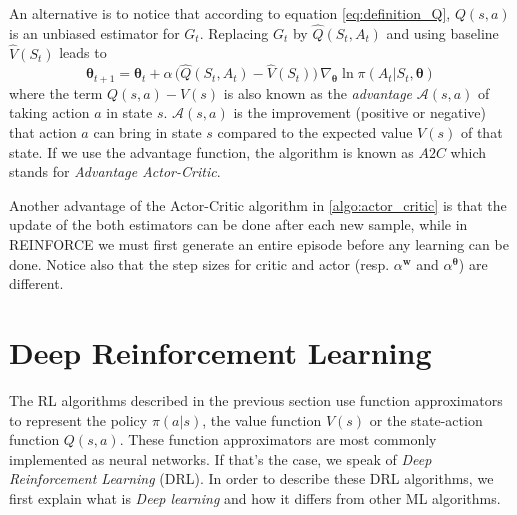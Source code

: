 An alternative is to notice that according to equation \ref{eq:definition_Q}, $Q(s,a)$ is an unbiased estimator for $G_t$. Replacing $G_t$ by $\hat Q(S_t, A_t)$ and using baseline $\hat V(S_t)$ leads to
\begin{equation}
\bm{\theta}_{t+1} = \bm{\theta}_{t} + \alpha \,\big (\hat Q(S_t, A_t) - \hat V(S_t) \big) \, \nabla_{\bm{\theta}} \ln \pi(A_t|S_t,\bm{\theta})
\end{equation}
where the term $Q(s,a) - V(s)$ is also known as the \emph{advantage} $\mathcal{A}(s, a)$ of taking action $a$ in state $s$. $\mathcal{A}(s, a)$ is the improvement (positive or negative) that action $a$ can bring in state $s$ compared to the expected value $V(s)$ of that state. If we use the advantage function, the algorithm is known as $A2C$ which stands for \emph{Advantage Actor-Critic}.\\

Another advantage of the Actor-Critic algorithm in \ref{algo:actor_critic} is that the update of the both estimators can be done after each new sample, while in REINFORCE we must first generate an entire episode before any learning can be done. Notice also that the step sizes for critic and actor (resp. $\alpha^{\bm{w}}$ and $\alpha^{\bm{\theta}}$) are different.\\

\section{Deep Reinforcement Learning}
\label{sec:intro_deep_rl}
The RL algorithms described in the previous section use function approximators to represent the policy $\pi(a|s)$, the value function $V(s)$ or the state-action function $Q(s,a)$. These function approximators are most commonly implemented as neural networks. If that's the case, we speak of \emph{Deep Reinforcement Learning} (DRL). In order to describe these DRL algorithms, we first explain what is \emph{Deep learning} and how it differs from other ML algorithms.

